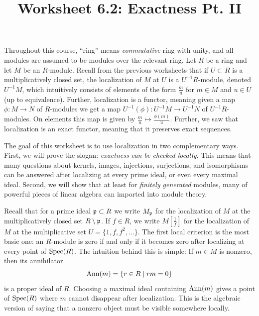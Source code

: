 \documentclass[12pt,reqno]{amsart}
\title{Worksheet 6.2: Exactness Pt. II }
\begin{document}

\maketitle
\thispagestyle{firstpage2}

Throughout this course, ``ring'' means \textit{commutative} ring with unity, and all modules are assumed to be modules over the relevant ring. Let $R$ be a ring and let $M$ be an $R$-module. Recall from the previous worksheets that if $U \subset R$ is a multiplicatively closed set, the localization of $M$ at $U$ is a $U^{-1}R$-module, denoted $U^{-1}M$, which intuitively consists of elements of the form $\frac{m}{u}$ for $m\in M$ and $u\in U$ (up to equivalence). Further, localization is a functor, meaning given a map $\phi:M \to N$ of  $R$-modules we get a map $U^{-1}(\phi):U^{-1}M \to U^{-1}N$ of $U^{-1}R$-modules. On elements this map is given by $\frac{m}{u}\mapsto \frac{\phi(m)}{u}$. Further, we saw that localization is an exact functor, meaning that it preserves exact sequences. 

The goal of this worksheet is to use localization in two complementary ways. First, we will prove the slogan: \emph{exactness can be checked locally}. This means that many questions about kernels, images, injections, surjections, and isomorphisms can be answered after localizing at every prime ideal, or even every maximal ideal. Second, we will show that at least for \emph{finitely generated} modules, many of powerful pieces of  linear algebra can imported into module theory. 

Recall that for a prime ideal $\mathfrak{p}\subset R$ we write $M_{\mathfrak{p}}$ for the localization of $M$ at the multiplicatively closed set $R\setminus \mathfrak{p}$. If $f\in R$, we write $M[\frac{1}{f}]$ for the localization of $M$ at the multiplicative set $U=\{1,f,f^2,\ldots\}$. The first local criterion is the most basic one: an $R$-module is zero if and only if it becomes zero after localizing at every point of $\operatorname{Spec}(R)$. The intuition behind this is simple: If $m\in M$ is nonzero, then its annihilator 
\[
\operatorname{Ann}(m)=\{r\in R\mid rm=0\}
\]
is a proper ideal of $R$. Choosing a maximal ideal containing $\operatorname{Ann}(m)$ gives a point of $\operatorname{Spec}(R)$ where $m$ cannot disappear after localization. This is the algebraic version of saying that a nonzero object must be visible somewhere locally.

\hrulefill
\end{document}
